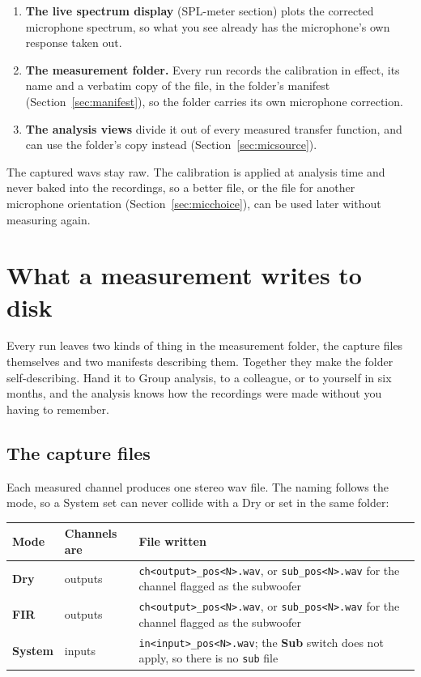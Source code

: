\begin{enumerate}[nosep]
  \item \textbf{The live spectrum display} (SPL-meter section) plots the corrected microphone spectrum, so what you see already has the microphone's own response taken out.
  \item \textbf{The measurement folder.} Every run records the calibration in effect, its name and a verbatim copy of the file, in the folder's manifest (Section~\ref{sec:manifest}), so the folder carries its own microphone correction.
  \item \textbf{The analysis views} divide it out of every measured transfer function, and can use the folder's copy instead (Section~\ref{sec:micsource}).
\end{enumerate}

\noindent The captured wavs stay raw. The calibration is applied at analysis time and never baked into the recordings, so a better file, or the file for another microphone orientation (Section~\ref{sec:micchoice}), can be used later without measuring again.

\section{What a measurement writes to disk}\label{sec:export}
Every run leaves two kinds of thing in the measurement folder, the capture files themselves and two manifests describing them. Together they make the folder self-describing. Hand it to Group analysis, to a colleague, or to yourself in six months, and the analysis knows how the recordings were made without you having to remember.

\subsection{The capture files}\label{sec:measfolder}
Each measured channel produces one stereo wav file. The naming follows the mode, so a System set can never collide with a Dry or  set in the same folder:

\begin{center}
\renewcommand{\arraystretch}{1.3}
\begin{tabularx}{\textwidth}{l l X}
\toprule
\textbf{Mode} & \textbf{Channels are} & \textbf{File written} \\
\midrule
\textbf{Dry}    & outputs & \texttt{ch<output>\_pos<N>.wav}, or
                            \texttt{sub\_pos<N>.wav} for the channel flagged
                            as the subwoofer \\
\textbf{FIR}    & outputs & \texttt{ch<output>\_pos<N>.wav}, or
                            \texttt{sub\_pos<N>.wav} for the channel flagged
                            as the subwoofer \\
\textbf{System} & inputs  & \texttt{in<input>\_pos<N>.wav}; the \textbf{Sub}
                            switch does not apply, so there is no
                            \texttt{sub} file \\
\bottomrule
\end{tabularx}
\end{center}

